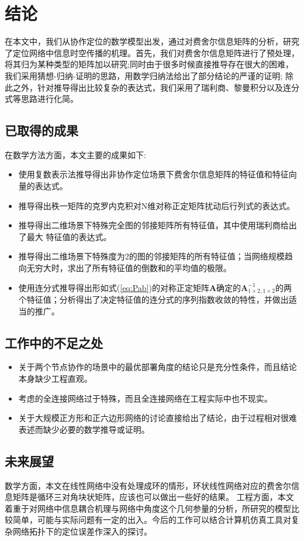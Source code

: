 \chapter{结论}\label{cha:content5}
    在本文中，我们从协作定位的数学模型出发，通过对费舍尔信息矩阵的分析，研究了定位网络中信息时空传播的机理。首先，我们对费舍尔信息矩阵进行了预处理，将其归为某种类型的矩阵加以研究;同时由于很多时候直接推导存在很大的困难，我们采用猜想-归纳-证明的思路，用数学归纳法给出了部分结论的严谨的证明;
    除此之外，针对推导得出比较复杂的表达式，我们采用了瑞利商、黎曼积分以及连分式等思路进行化简。
  \section{已取得的成果}
  在数学方法方面，本文主要的成果如下:
  \begin{itemize}
  \item
    使用复数表示法推导得出非协作定位场景下费舍尔信息矩阵的特征值和特征向量的表达式。
  \item
    推导得出秩一矩阵的克罗内克积对N维对称正定矩阵扰动后行列式的表达式。
  \item
    推导得出二维场景下特殊完全图的邻接矩阵所有特征值，其中使用瑞利商给出了最大 特征值的表达式。
  \item 推导得出二维场景下特殊度为2的图的邻接矩阵的所有特征值；当网络规模趋向无穷大时，求出了所有特征值的倒数和的平均值的极限。
  \item 使用连分式推导得出形如式(\ref{eq:Pab})的对称正定矩阵$\bm{A}$确定的$\bm{A}^{-1}_{1\times2,1\times2}$的两个特征值；分析得出了决定特征值的连分式的序列指数收敛的特性，并做出适当的推广。
  \end{itemize}
  \section{工作中的不足之处}
  \begin{itemize}
  \item
  关于两个节点协作的场景中的最优部署角度的结论只是充分性条件，而且结论本身缺少工程直观。
  \item
  考虑的全连接网络过于特殊，而且全连接网络在工程实际中也不现实。
  \item
  关于大规模正方形和正六边形网络的讨论直接给出了结论，由于过程相对很难表述而缺少必要的数学推导或证明。
  \end{itemize}
  \section{未来展望}

  数学方面，本文在线性网络中没有处理成环的情形，环状线性网络对应的费舍尔信息矩阵是循环三对角块状矩阵，应该也可以做出一些好的结果。
  工程方面，本文着重于对网络中信息耦合机理与网络中角度这个几何参量的分析，所研究的模型比较简单，可能与实际问题有一定的出入。今后的工作可以结合计算机仿真工具对复杂网络拓扑下的定位误差作深入的探讨。


